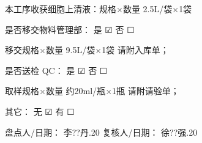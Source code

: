 \documentclass[UTF8,10pt,a4paper,fontset=fandol]{ctexart}
\newcommand{\fieldvalue}[1]{#1}
\newcommand{\handwritten}[1]{#1}
\newcommand{\checkboxfield}[1]{\ifstrequal{#1}{checked}{☑}{\ifstrequal{#1}{unclear}{?}{☐}}}
\begin{document}
\vspace{0.8em}

本工序收获细胞上清液：规格$\times$数量\quad
\fieldvalue{\handwritten{2.5L/袋$\times$1袋}}

\vspace{0.8em}

是否移交物料管理部：
是\quad
\fieldvalue{\handwritten{\checkboxfield{checked}}}
\quad 否\quad
\fieldvalue{\checkboxfield{unchecked}}

\vspace{0.8em}

移交规格$\times$数量\quad
\fieldvalue{\handwritten{9.5L/袋$\times$1袋}}
\quad 请附入库单；

\vspace{0.8em}

是否送检 QC：
是\quad
\fieldvalue{\handwritten{\checkboxfield{checked}}}
\quad 否\quad
\fieldvalue{\checkboxfield{unchecked}}

\vspace{0.8em}

取样规格$\times$数量\quad
\fieldvalue{\handwritten{约20ml/瓶$\times$1瓶}}
\quad 请附请验单；

\vspace{0.8em}

其它：
无\quad
\fieldvalue{\handwritten{\checkboxfield{checked}}}
\quad 有\quad
\fieldvalue{\checkboxfield{unchecked}}
\underline{\hspace{3cm}}

\vspace{0.8em}

盘点人/日期：
\fieldvalue{\handwritten{李??丹.20}}
\hfill
复核人/日期：
\fieldvalue{\handwritten{徐??强.20}}
\end{document}
